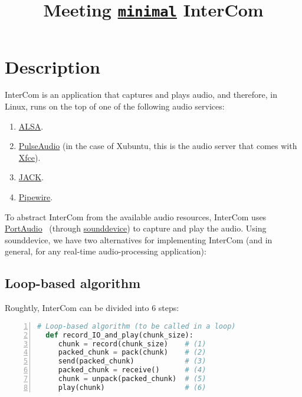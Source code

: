 
\title{Meeting \href{https://github.com/Tecnologias-multimedia/InterCom/blob/master/src/minimal.py}{\texttt{minimal}} InterCom}

\maketitle
\tableofcontents

\section{Description}

InterCom is an application that captures and plays audio, and
therefore, in Linux, runs on the top of one of the following audio
services:
\begin{enumerate}
\item \href{https://vicente-gonzalez-ruiz.github.io/ALSA/}{ALSA}.
\item
  \href{https://vicente-gonzalez-ruiz.github.io/PulseAudio/}{PulseAudio}
  (in the case of Xubuntu, this is the audio server that comes with
  \href{https://www.xfce.org/}{Xfce}).
\item \href{https://vicente-gonzalez-ruiz.github.io/JACK/}{JACK}.
\item \href{https://pipewire.org/}{Pipewire}.
\end{enumerate}

To abstract InterCom from the available audio resources, InterCom uses
\href{http://www.portaudio.com/}{PortAudio}~\cite{portaudio} (through
\href{https://vicente-gonzalez-ruiz.github.io/intro_to_sounddevice/}{sounddevice})
to capture and play the audio. Using sounddevice, we have two
alternatives for implementing InterCom (and in general, for any
real-time audio-processing application):

\subsection{Loop-based algorithm}

Roughtly, InterCom can be divided into 6 steps:

\begin{lstlisting}[language=Python,numbers=left]
  # Loop-based algorithm (to be called in a loop)
  def record_IO_and_play(chunk_size):
     chunk = record(chunk_size)    # (1)
     packed_chunk = pack(chunk)    # (2)
     send(packed_chunk)            # (3)
     packed_chunk = receive()      # (4)
     chunk = unpack(packed_chunk)  # (5)
     play(chunk)                   # (6)
\end{lstlisting}

